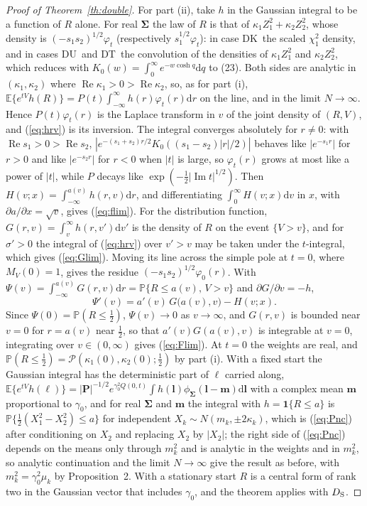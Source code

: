 \documentclass[ecta,nameyear,final,supplement]{econsocart}
\newcommand{\E}{{\mathbb E}}
\newcommand{\PP}{{\mathbb P}}
\newcommand{\dr}[1]{{\mathrm d}#1}
\newcommand{\Rea}{\operatorname{Re}}
\newcommand{\Ima}{\operatorname{Im}}
\newcommand{\Fk}{\textsf{\upshape DK}}
\newcommand{\Fu}{\textsf{\upshape DU}}
\newcommand{\Ft}{\textsf{\upshape DT}}
\newcommand{\cP}{\mathcal{P}}
\newcommand{\bSig}{\boldsymbol{\Sigma}}
\newcommand{\bP}{\boldsymbol{P}}
\theoremstyle{plain}
\theoremstyle{definition}
\begin{document}
\begin{proof}[Proof of Theorem~\ref{th:double}]
For part (ii), take $h$ in the Gaussian integral to be a function of $R$ alone.  For real $\bSig$ the law of $R$ is that of $\kappa_1Z_1^2+\kappa_2Z_2^2$, whose density is $(-s_1s_2)^{1/2}\varphi_t$ (respectively $s_1^{1/2}\varphi_t$): in case \Fk\ the scaled $\chi^2_1$ density, and in cases \Fu\ and \Ft\ the convolution of the densities of $\kappa_1Z_1^2$ and $\kappa_2Z_2^2$, which reduces with $K_0(w)=\int_0^\infty e^{-w\cosh q}\dr{q}$ to (23).  Both sides are analytic in $(\kappa_1,\kappa_2)$ where $\Rea\kappa_1>0>\Rea\kappa_2$, so, as for part (i), $\E\{e^{tV}h(R)\}=P(t)\int_{-\infty}^{\infty}h(r)\varphi_t(r)\dr{r}$ on the line, and in the limit $N\to\infty$.  Hence $P(t)\varphi_t(r)$ is the Laplace transform in $v$ of the joint density of $(R,V)$, and (\ref{eq:hrv}) is its inversion.  The integral converges absolutely for $r\ne0$: with $\Rea s_1>0>\Rea s_2$, $|e^{-(s_1+s_2)r/2}K_0((s_1-s_2)|r|/2)|$ behaves like $|e^{-s_1r}|$ for $r>0$ and like $|e^{-s_2r}|$ for $r<0$ when $|t|$ is large, so $\varphi_t(r)$ grows at most like a power of $|t|$, while $P$ decays like $\exp(-\frac12|\Ima t|^{1/2})$.  Then $H(v;x)=\int_{-\infty}^{a(v)}h(r,v)\dr{r}$, and differentiating $\int_0^\infty H(v;x)\dr{v}$ in $x$, with $\partial a/\partial x=\sqrt v$, gives (\ref{eq:flim}).  For the distribution function, $G(r,v)=\int_v^\infty h(r,v')\dr{v'}$ is the density of $R$ on the event $\{V>v\}$, and for $\sigma'>0$ the integral of (\ref{eq:hrv}) over $v'>v$ may be taken under the $t$-integral, which gives (\ref{eq:Glim}).  Moving its line across the simple pole at $t=0$, where $M_V(0)=1$, gives the residue $(-s_1s_2)^{1/2}\varphi_0(r)$.  With $\Psi(v)=\int_{-\infty}^{a(v)}G(r,v)\dr{r}=\PP\{R\le a(v),\,V>v\}$ and $\partial G/\partial v=-h$,
\[
\Psi'(v)=a'(v)\,G\big(a(v),v\big)-H(v;x).
\]
Since $\Psi(0)=\PP(R\le\frac12)$, $\Psi(v)\to0$ as $v\to\infty$, and $G(r,v)$ is bounded near $v=0$ for $r=a(v)$ near $\frac12$, so that $a'(v)G(a(v),v)$ is integrable at $v=0$, integrating over $v\in(0,\infty)$ gives (\ref{eq:Flim}).  At $t=0$ the weights are real, and $\PP(R\le\frac12)=\cP(\kappa_1(0),\kappa_2(0);\frac12)$ by part (i).  With a fixed start the Gaussian integral has the deterministic part of $\bm\ell$ carried along, $\E\{e^{tV}h(\bm\ell)\}=|\bP|^{-1/2}e^{\gamma_0^2Q(0,t)}\int h(\bm l)\phi_{\bSig}(\bm l-\bm m)\dr{\bm l}$ with a complex mean $\bm m$ proportional to $\gamma_0$, and for real $\bSig$ and $\bm m$ the integral with $h=\mathbf{1}\{R\le a\}$ is $\PP\{\frac12(X_1^2-X_2^2)\le a\}$ for independent $X_k\sim N(m_k,\pm2\kappa_k)$, which is (\ref{eq:Pnc}) after conditioning on $X_2$ and replacing $X_2$ by $|X_2|$; the right side of (\ref{eq:Pnc}) depends on the means only through $m_k^2$ and is analytic in the weights and in $m_k^2$, so analytic continuation and the limit $N\to\infty$ give the result as before, with $m_k^2=\gamma_0^2\mu_k$ by Proposition~2.  With a stationary start $R$ is a central form of rank two in the Gaussian vector that includes $\gamma_0$, and the theorem applies with $D_{\rm S}$.
\end{proof}
\end{document}
